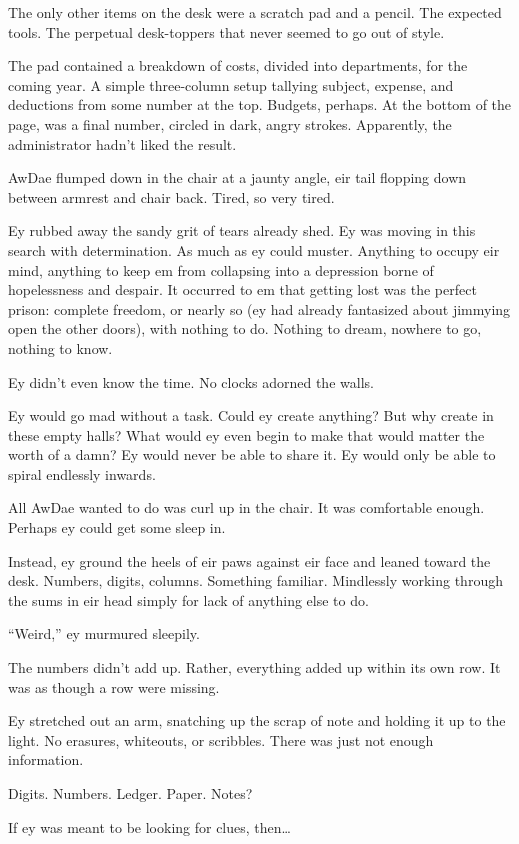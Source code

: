 The only other items on the desk were a scratch pad and a pencil. The expected tools. The perpetual desk-toppers that never seemed to go out of style.

The pad contained a breakdown of costs, divided into departments, for the coming year. A simple three-column setup tallying subject, expense, and deductions from some number at the top. Budgets, perhaps. At the bottom of the page, was a final number, circled in dark, angry strokes. Apparently, the administrator hadn't liked the result.

AwDae flumped down in the chair at a jaunty angle, eir tail flopping down between armrest and chair back. Tired, so very tired.

Ey rubbed away the sandy grit of tears already shed. Ey was moving in this search with determination. As much as ey could muster. Anything to occupy eir mind, anything to keep em from collapsing into a depression borne of hopelessness and despair. It occurred to em that getting lost was the perfect prison: complete freedom, or nearly so (ey had already fantasized about jimmying open the other doors), with nothing to do. Nothing to dream, nowhere to go, nothing to know.

Ey didn't even know the time. No clocks adorned the walls.

Ey would go mad without a task. Could ey create anything? But why create in these empty halls? What would ey even begin to make that would matter the worth of a damn? Ey would never be able to share it. Ey would only be able to spiral endlessly inwards.

All AwDae wanted to do was curl up in the chair. It was comfortable enough. Perhaps ey could get some sleep in.

Instead, ey ground the heels of eir paws against eir face and leaned toward the desk. Numbers, digits, columns. Something familiar. Mindlessly working through the sums in eir head simply for lack of anything else to do.

``Weird,'' ey murmured sleepily.

The numbers didn't add up. Rather, everything added up within its own row. It was as though a row were missing.

Ey stretched out an arm, snatching up the scrap of note and holding it up to the light. No erasures, whiteouts, or scribbles. There was just not enough information.

Digits. Numbers. Ledger. Paper. Notes?

If ey was meant to be looking for clues, then\ldots{}

